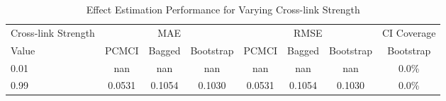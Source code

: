 \begin{table}[htbp]
\centering
\caption{Effect Estimation Performance for Varying Cross-link Strength}
\label{tab:cross_performance}
\begin{tabular}{l|ccc|ccc|c}
\hline
Cross-link Strength & \multicolumn{3}{c|}{MAE} & \multicolumn{3}{c|}{RMSE} & CI Coverage \\
 Value & PCMCI & Bagged & Bootstrap & PCMCI & Bagged & Bootstrap & Bootstrap \\
\hline
0.01 & nan & nan & nan & nan & nan & nan & 0.0\% \\
0.99 & 0.0531 & 0.1054 & 0.1030 & 0.0531 & 0.1054 & 0.1030 & 0.0\% \\
\hline
\end{tabular}
\end{table}
